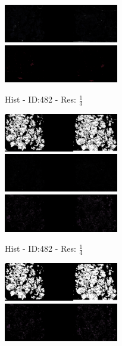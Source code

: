 \documentclass[letterpaper,10pt,oneside]{article}
\begin{document}
\begin{figure}[hbtp]
\begin{subfigure}[b]{5cm}
    \includegraphics[width=5cm]{visualization/results/histogramSeg/res_reduce_3/Region_1_PO14-00482B3_1_2_201404171123.png}
    \includegraphics[width=5cm]{visualization/results/histogramSeg/res_reduce_3/Region_2_PO14-00482B3_1_2_201404171123.png}
    \caption{Hist - ID:482 - Res: $\frac{1}{3}$}
  \end{subfigure}
  \begin{subfigure}[b]{5cm}
    \includegraphics[width=5cm]{visualization/results/histogramSeg/res_reduce_4/Region_0_PO14-00482B3_1_2_201404171123.png}
    \includegraphics[width=5cm]{visualization/results/histogramSeg/res_reduce_4/Region_1_PO14-00482B3_1_2_201404171123.png}
    \includegraphics[width=5cm]{visualization/results/histogramSeg/res_reduce_4/Region_2_PO14-00482B3_1_2_201404171123.png}
    \caption{Hist - ID:482 - Res: $\frac{1}{4}$}
  \end{subfigure}
  \begin{subfigure}[b]{5cm}
    \includegraphics[width=5cm]{visualization/results/histogramSeg/res_reduce_5/Region_0_PO14-00482B3_1_2_201404171123.png}
    \includegraphics[width=5cm]{visualization/results/histogramSeg/res_reduce_5/Region_1_PO14-00482B3_1_2_201404171123.png}

\end{subfigure}
\end{figure}
\end{document}
